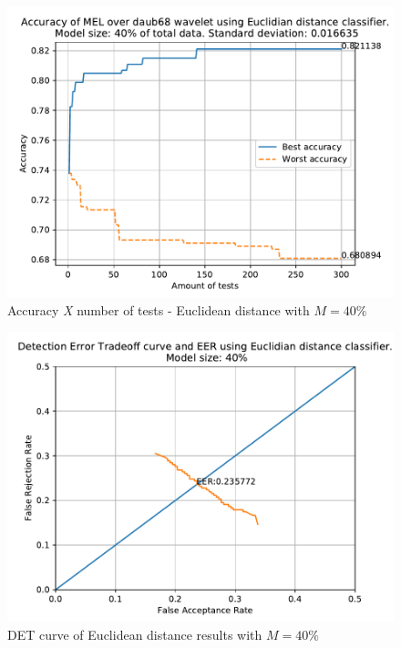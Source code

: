 	
		\begin{figure}[H]
			\centering
			\includegraphics[scale=.8]{images/results/confusionMatrices/classifier_Euclidian_40.pdf}
			\caption{Accuracy \textit{X} number of tests - Euclidean distance with $M=40\%$}
			\label{fig:classifiereuclidian40}
		\end{figure}
		\begin{figure}[H]
			\centering
			\includegraphics[scale=.8]{images/results/det/DET_for_classifier_Euclidian_40.pdf}
			\caption{DET curve of Euclidean distance results with $M=40\%$}
			\label{fig:detforclassifiereuclidian40}
		\end{figure}
	
